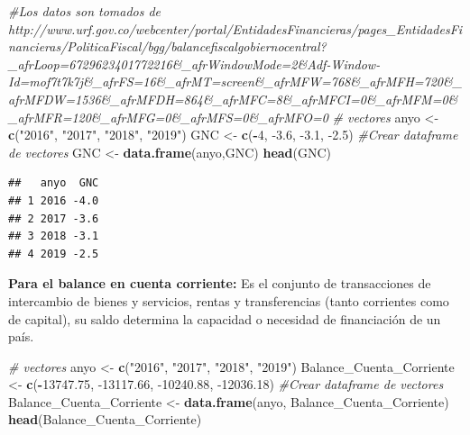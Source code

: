 \documentclass[
  11pt,
]{article}
\newenvironment{Shaded}{\begin{snugshade}}{\end{snugshade}}
\newcommand{\CommentTok}[1]{\textcolor[rgb]{0.56,0.35,0.01}{\textit{#1}}}
\newcommand{\DecValTok}[1]{\textcolor[rgb]{0.00,0.00,0.81}{#1}}
\newcommand{\FloatTok}[1]{\textcolor[rgb]{0.00,0.00,0.81}{#1}}
\newcommand{\KeywordTok}[1]{\textcolor[rgb]{0.13,0.29,0.53}{\textbf{#1}}}
\newcommand{\NormalTok}[1]{#1}
\newcommand{\OperatorTok}[1]{\textcolor[rgb]{0.81,0.36,0.00}{\textbf{#1}}}
\newcommand{\StringTok}[1]{\textcolor[rgb]{0.31,0.60,0.02}{#1}}
\begin{document}
\begin{Shaded}
\begin{Highlighting}[]
\CommentTok{#Los datos son tomados de http://www.urf.gov.co/webcenter/portal/EntidadesFinancieras/pages_EntidadesFinancieras/PoliticaFiscal/bgg/balancefiscalgobiernocentral?_afrLoop=6729623401772216&_afrWindowMode=2&Adf-Window-Id=mof7t7k7j&_afrFS=16&_afrMT=screen&_afrMFW=768&_afrMFH=720&_afrMFDW=1536&_afrMFDH=864&_afrMFC=8&_afrMFCI=0&_afrMFM=0&_afrMFR=120&_afrMFG=0&_afrMFS=0&_afrMFO=0}
\CommentTok{# vectores }
\NormalTok{anyo <-}\StringTok{ }\KeywordTok{c}\NormalTok{(}\StringTok{"2016"}\NormalTok{, }\StringTok{"2017"}\NormalTok{, }\StringTok{"2018"}\NormalTok{, }\StringTok{"2019"}\NormalTok{)}
\NormalTok{GNC <-}\StringTok{ }\KeywordTok{c}\NormalTok{(}\OperatorTok{-}\DecValTok{4}\NormalTok{, }\FloatTok{-3.6}\NormalTok{, }\FloatTok{-3.1}\NormalTok{, }\FloatTok{-2.5}\NormalTok{)}
\CommentTok{#Crear dataframe de vectores}
\NormalTok{GNC <-}\StringTok{ }\KeywordTok{data.frame}\NormalTok{(anyo,GNC)}
\KeywordTok{head}\NormalTok{(GNC)}
\end{Highlighting}
\end{Shaded}

\begin{verbatim}
##   anyo  GNC
## 1 2016 -4.0
## 2 2017 -3.6
## 3 2018 -3.1
## 4 2019 -2.5
\end{verbatim}

\textbf{Para el balance en cuenta corriente:} Es el conjunto de
transacciones de intercambio de bienes y servicios, rentas y
transferencias (tanto corrientes como de capital), su saldo determina la
capacidad o necesidad de financiación de un país.

\begin{Shaded}
\begin{Highlighting}[]
\CommentTok{# vectores }
\NormalTok{anyo <-}\StringTok{ }\KeywordTok{c}\NormalTok{(}\StringTok{"2016"}\NormalTok{, }\StringTok{"2017"}\NormalTok{, }\StringTok{"2018"}\NormalTok{, }\StringTok{"2019"}\NormalTok{)}
\NormalTok{Balance_Cuenta_Corriente <-}\StringTok{ }\KeywordTok{c}\NormalTok{(}\OperatorTok{-}\FloatTok{13747.75}\NormalTok{, }\FloatTok{-13117.66}\NormalTok{, }\FloatTok{-10240.88}\NormalTok{, }\FloatTok{-12036.18}\NormalTok{)}
\CommentTok{#Crear dataframe de vectores}
\NormalTok{Balance_Cuenta_Corriente <-}\StringTok{ }\KeywordTok{data.frame}\NormalTok{(anyo, Balance_Cuenta_Corriente)}
\KeywordTok{head}\NormalTok{(Balance_Cuenta_Corriente)}
\end{Highlighting}
\end{Shaded}
\end{document}
